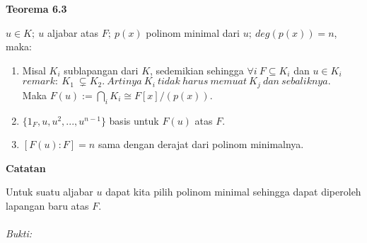 \textbf{Teorema 6.3}
\par $u \in K;~u$ aljabar atas $F;~p(x)$ polinom minimal dari $u;~deg(p(x))=n$, maka:
\begin{enumerate}
\item Misal $K_i$ sublapangan dari $K$, sedemikian sehingga $\forall i~F \subseteq K_i$ dan $u \in K_i$
\\ $remark:~K_1~\subsetneq K_2.~Artinya~K_i~tidak~harus~memuat~K_j~dan~sebaliknya.$
\\ Maka $F(u):= \bigcap^{}_{i} K_i \cong F[x]/(p(x))$.
\item $\{1_F,u,u^2,...,u^{n-1}\}$ basis untuk $F(u)$ atas $F$.
\item$[F(u):F]=n$ sama dengan derajat dari polinom minimalnya.
\end{enumerate}
\textbf{Catatan}
\par 	Untuk suatu aljabar $u$ dapat kita pilih polinom minimal sehingga dapat diperoleh lapangan baru atas $F$.
\\
\\
\textit{Bukti:}
